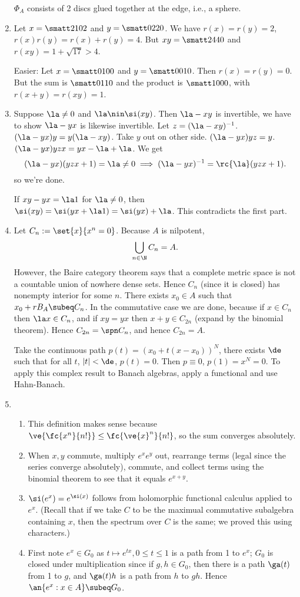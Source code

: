 \begin{enumerate}
$\Phi_A$ consists of 2 discs glued together at the edge, i.e., a sphere.

\item Let $x=\smatt2102$ and $y=\smatt 0220$. We have $r(x)=r(y)=2$, $r(x)r(y)=r(x)+r(y)=4$. But $xy=\smatt 2440$ and $r(xy)=1+\sqrt{17}>4$.

Easier: Let $x=\smatt 0100$ and $y=\smatt 0010$. Then $r(x)=r(y)=0$. But the sum is $\smatt 0110$ and the product is $\smatt 1000$, with $r(x+y)=r(xy)=1$.
\item Suppose $\la\ne 0$ and $\la\nin \si(xy)$. Then $\la-xy$ is invertible, we have to show $\la-yx$ is likewise invertible. Let $z=(\la-xy)^{-1}$. $(\la-yx)y=y(\la-xy)$. Take $y$ out on other side. $(\la-yx)yz=y$. $(\la-yx)yzx=yx-\la+\la$.
We get
\[
(\la -yx)(yzx+1)=\la\ne 0\implies (\la-yx)^{-1}=\rc{\la}(yzx+1).
\] 
so we're done.

If $xy-yx=\la 1$ for $\la \ne 0$, then $\si(xy)=\si(yx+\la 1)=\si(yx)+\la$. This contradicts the first part. %
\item Let $C_n:=\set{x}{x^n=0}$. Because $A$ is nilpotent,
\[
\bigcup_{n\in \N} C_n=A.
\]
However, the Baire category theorem says that a complete metric space is not a countable union of nowhere dense sets. Hence $C_n$ (since it is closed) has nonempty interior for some $n$. %
There exists $x_0\in A$ such that $x_0+rB_A\subeq C_n$. In the commutative case we are done, because if $x\in C_n$ then $\la x\in C_n$, and if $xy=yx$ then $x+y\in C_{2n}$ (expand by the binomial theorem). Hence $C_{2n}=\spn C_n$, and hence $C_{2n}=A$.

Take the continuous path $p(t)=(x_0+t(x-x_0))^N$, there exists $\de$ such that for all $t$, $|t|<\de$, $p(t)=0$. Then $p\equiv 0$, $p(1)=x^N=0$. To apply this complex result to Banach algebras, apply a functional and use Hahn-Banach.
\item 
\begin{enumerate}
\item
This definition makes sense because $\ve{\fc{x^n}{n!}}\le \fc{\ve{x}^n}{n!}$, so the sum converges absolutely. 
\item
When $x,y$ commute, multiply $e^xe^y$ out, rearrange terms (legal since the series converge absolutely), commute, and collect terms using the binomial theorem to see that it equals $e^{x+y}$.
\item 
$\si(e^x)=e^{\si(x)}$ follows from holomorphic functional calculus applied to $e^x$. (Recall that if we take $C$ to be the maximual commutative subalgebra containing $x$, then the spectrum over $C$ is the same; we proved this using characters.) %
\item
First note $e^x\in G_0$ as $t\mapsto e^{tx},0\le t\le 1$ is a path from 1 to $e^x$; $G_0$ is closed under multiplication since if $g,h\in G_0$, then there is a path $\ga(t)$ from 1 to $g$, and $\ga(t)h$ is a path from $h$ to $gh$. Hence $\an{e^x:x\in A}\subeq G_0$. 


\end{enumerate}
\end{enumerate}
